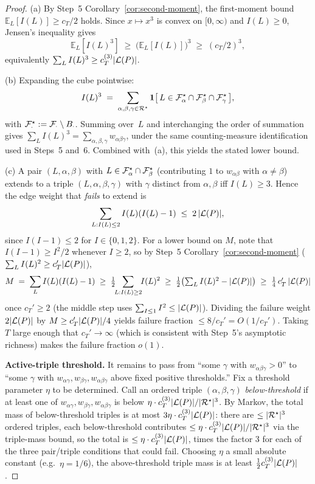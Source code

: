 \begin{proof}
(a) By Step~5 Corollary~\ref{cor:second-moment}, the first-moment bound
$\mathbb{E}_L[I(L)]\ge c_T/2$ holds.  Since $x\mapsto x^3$ is convex
on $[0,\infty)$ and $I(L)\ge 0$, Jensen's inequality gives
\[
  \mathbb{E}_L[I(L)^3] \;\ge\; \bigl(\mathbb{E}_L[I(L)]\bigr)^3
  \;\ge\; (c_T/2)^3,
\]
equivalently $\sum_L I(L)^3\ge c_T^{(3)}|\mathcal{L}(P)|$.

(b) Expanding the cube pointwise:
\[
  I(L)^3
  \;=\; \sum_{\alpha,\beta,\gamma\in\mathcal{R}^\star}
  \mathbf{1}\bigl[\,L\in\mathcal{F}_{\alpha}^\star\cap\mathcal{F}_{\beta}^\star
  \cap\mathcal{F}_{\gamma}^\star\,\bigr],
\]
with $\mathcal{F}_{\cdot}^\star:=\mathcal{F}_{\cdot}\setminus B_{\cdot}$.
Summing over~$L$ and interchanging the order of summation gives
$\sum_L I(L)^3 = \sum_{\alpha,\beta,\gamma}w_{\alpha\beta\gamma}$,
under the same counting-measure identification used in Steps~5 and~6.
Combined with~(a), this yields the stated lower bound.

(c) A pair $(L,\alpha,\beta)$ with $L\in\mathcal{F}_{\alpha}^\star\cap
\mathcal{F}_{\beta}^\star$ (contributing $1$ to $w_{\alpha\beta}$ with
$\alpha\ne\beta$) extends to a triple
$(L,\alpha,\beta,\gamma)$ with $\gamma$ distinct from $\alpha,\beta$
iff $I(L)\ge 3$.  Hence the edge weight that \emph{fails} to extend
is
\[
  \sum_{L:I(L)\le 2}I(L)(I(L)-1)
  \;\le\; 2\,|\mathcal{L}(P)|,
\]
since $I(I-1)\le 2$ for $I\in\{0,1,2\}$.  For a lower bound on $M$,
note that $I(I-1)\ge I^2/2$ whenever $I\ge 2$, so by Step~5
Corollary~\ref{cor:second-moment} ($\sum_L I(L)^2\ge c_T'|\mathcal{L}(P)|$),
\[
  M \;=\; \sum_L I(L)(I(L)-1)
  \;\ge\; \tfrac12\!\!\sum_{L:I(L)\ge 2}\!\! I(L)^2
  \;\ge\; \tfrac12\bigl(\textstyle\sum_L I(L)^2 - |\mathcal{L}(P)|\bigr)
  \;\ge\; \tfrac14\,c_T'\,|\mathcal{L}(P)|
\]
once $c_T'\ge 2$ (the middle step uses
$\sum_{I\le 1}I^2\le|\mathcal{L}(P)|$).  Dividing the failure weight
$2|\mathcal{L}(P)|$ by $M\ge c_T'|\mathcal{L}(P)|/4$ yields failure fraction
$\le 8/c_T'=O(1/c_T')$.  Taking $T$ large enough that $c_T'\to\infty$
(which is consistent with Step~5's asymptotic richness) makes the
failure fraction $o(1)$.

\textbf{Active-triple threshold.}  It remains to pass from
``some $\gamma$ with $w_{\alpha\beta\gamma}>0$'' to ``some $\gamma$
with $w_{\alpha\gamma},w_{\beta\gamma},w_{\alpha\beta\gamma}$ above
fixed positive thresholds.''
Fix a threshold parameter $\eta$ to be determined.
Call an ordered triple $(\alpha,\beta,\gamma)$ \emph{below-threshold}
if at least one of $w_{\alpha\gamma},w_{\beta\gamma},
w_{\alpha\beta\gamma}$ is below $\eta\cdot c_T^{(3)}|\mathcal{L}(P)|/|\mathcal{R}^\star|^3$.
By Markov, the total mass of below-threshold triples is at most
$3\eta\cdot c_T^{(3)}|\mathcal{L}(P)|$: there are $\le|\mathcal{R}^\star|^3$ ordered
triples, each below-threshold contributes $\le\eta\cdot
c_T^{(3)}|\mathcal{L}(P)|/|\mathcal{R}^\star|^3$ via the triple-mass bound, so the
total is $\le\eta\cdot c_T^{(3)}|\mathcal{L}(P)|$, times the factor $3$ for
each of the three pair/triple conditions that could fail.
Choosing $\eta$ a small absolute constant (e.g.\ $\eta=1/6$), the
above-threshold triple mass is at least $\tfrac12 c_T^{(3)}|\mathcal{L}(P)|$.


\end{proof}
